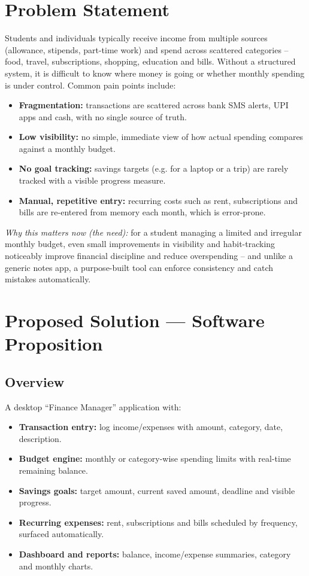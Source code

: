 \documentclass{article}
\begin{document}
\section{Problem Statement}
Students and individuals typically receive income from multiple sources (allowance, stipends, part-time work) and spend across scattered categories -- food, travel, subscriptions, shopping, education and bills. Without a structured system, it is difficult to know where money is going or whether monthly spending is under control. Common pain points include:
\begin{itemize}[noitemsep]
  \item \textbf{Fragmentation:} transactions are scattered across bank SMS alerts, UPI apps and cash, with no single source of truth.
  \item \textbf{Low visibility:} no simple, immediate view of how actual spending compares against a monthly budget.
  \item \textbf{No goal tracking:} savings targets (e.g. for a laptop or a trip) are rarely tracked with a visible progress measure.
  \item \textbf{Manual, repetitive entry:} recurring costs such as rent, subscriptions and bills are re-entered from memory each month, which is error-prone.
\end{itemize}
\textit{Why this matters now (the need):} for a student managing a limited and irregular monthly budget, even small improvements in visibility and habit-tracking noticeably improve financial discipline and reduce overspending -- and unlike a generic notes app, a purpose-built tool can enforce consistency and catch mistakes automatically.

\section{Proposed Solution --- Software Proposition}
\subsection{Overview}
A desktop ``Finance Manager'' application with:
\begin{itemize}[noitemsep]
  \item \textbf{Transaction entry:} log income/expenses with amount, category, date, description.
  \item \textbf{Budget engine:} monthly or category-wise spending limits with real-time remaining balance.
  \item \textbf{Savings goals:} target amount, current saved amount, deadline and visible progress.
  \item \textbf{Recurring expenses:} rent, subscriptions and bills scheduled by frequency, surfaced automatically.
  \item \textbf{Dashboard and reports:} balance, income/expense summaries, category and monthly charts.
\end{itemize}
\end{document}
